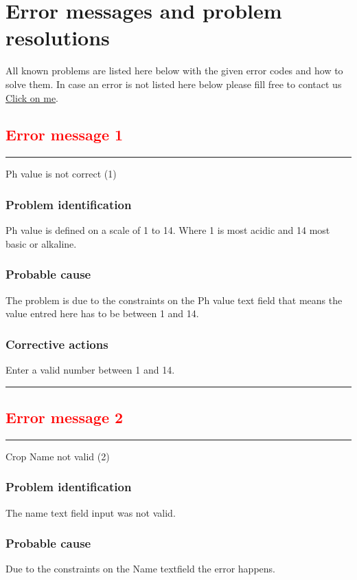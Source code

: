
\chapter{Error messages and problem resolutions}
\label{chap:error_messages}

All known problems are listed here below with the given error codes and how to
solve them. In case an error is not listed here below please fill free to
contact us \hyperref[sec:Contact]{Click on me}.


\section{\textbf{\textcolor{red}{Error message 1}}}
\hrule
\vspace{0.5cm}
Ph value is not correct (1)
\subsection{Problem identification}
Ph value is defined on a scale of 1 to 14.  Where 1 is most acidic and 14 most
basic or alkaline.

\subsection{Probable cause}

The problem is due to the constraints on the Ph value text field that means the
value entred here has to be between 1 and 14.

\subsection{Corrective actions}
Enter a valid number between 1 and 14.
\vspace{0.5cm}
\hrule


\break

\section{\textbf{\textcolor{red}{Error message 2}}}
\hrule
\vspace{0.5cm}
Crop Name not valid (2)
\subsection{Problem identification}
The name text field input was not valid.

\subsection{Probable cause}
Due to the constraints on the Name textfield the error happens.

